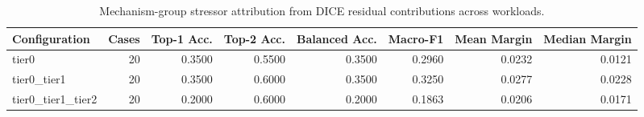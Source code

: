 \begin{table}[t]
\centering
\caption{Mechanism-group stressor attribution from DICE residual contributions across workloads.}
\label{tab:dice_stressor_diagnosis}
\footnotesize
\begin{tabular}{lrrrrrrr}
\toprule
Configuration & Cases & Top-1 Acc. & Top-2 Acc. & Balanced Acc. & Macro-F1 & Mean Margin & Median Margin \\
\midrule
tier0 & 20 & 0.3500 & 0.5500 & 0.3500 & 0.2960 & 0.0232 & 0.0121 \\
tier0_tier1 & 20 & 0.3500 & 0.6000 & 0.3500 & 0.3250 & 0.0277 & 0.0228 \\
tier0_tier1_tier2 & 20 & 0.2000 & 0.6000 & 0.2000 & 0.1863 & 0.0206 & 0.0171 \\
\bottomrule
\end{tabular}

\end{table}

